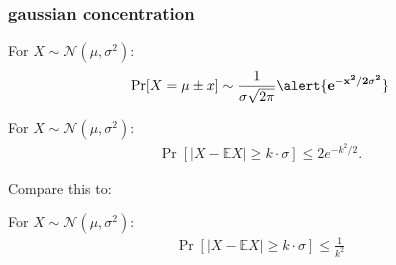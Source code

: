 \documentclass[compress]{beamer}
\newcommand{\E}{\mathbb{E}}
\begin{document}
\begin{frame}
	\frametitle{gaussian concentration}
	\small
	For $X \sim \mathcal{N}(\mu,\sigma^2)$:
	\begin{align*}
		\Pr[X = \mu \pm x] \sim \frac{1}{\sigma\sqrt{2\pi}} \alert{\mathbf{e^{-x^2/2\sigma^2}}}
	\end{align*}
	\vspace{-1em}
	\begin{lemma}
		For $X \sim \mathcal{N}(\mu,\sigma^2)$:\vspace{-.5em}
		\begin{align*}
			\Pr[|X - \E X| \geq k\cdot\sigma] \leq 2e^{-k^2/2}.
		\end{align*}
	\end{lemma}
Compare this to: 
	\begin{lemma}
	For $X \sim \mathcal{N}(\mu,\sigma^2)$:\vspace{-.5em}
	\begin{align*}
		\Pr[|X - \E X| \geq k\cdot\sigma] \leq \frac{1}{k^2}
	\end{align*}
\end{lemma}
\end{frame}
\end{document}
